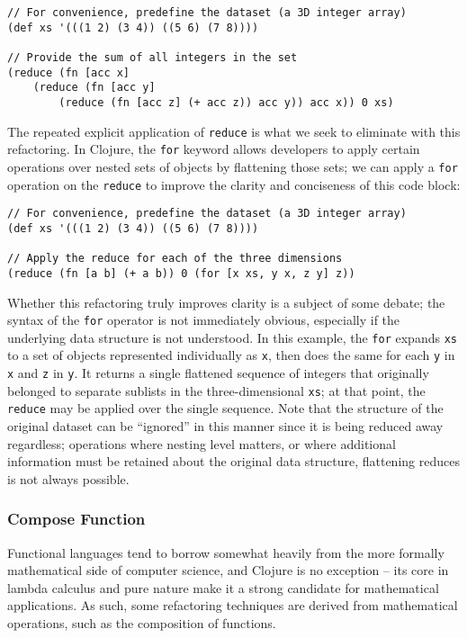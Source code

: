 \documentclass{article}
\begin{document}
\begin{verbatim}
// For convenience, predefine the dataset (a 3D integer array)
(def xs '(((1 2) (3 4)) ((5 6) (7 8))))

// Provide the sum of all integers in the set
(reduce (fn [acc x]
    (reduce (fn [acc y]
        (reduce (fn [acc z] (+ acc z)) acc y)) acc x)) 0 xs)
\end{verbatim}

The repeated explicit application of \verb!reduce! is what we seek to eliminate with this refactoring. In Clojure, the \verb!for! keyword allows developers to apply certain operations over nested sets of objects by flattening those sets; we can apply a \verb!for! operation on the \verb!reduce! to improve the clarity and conciseness of this code block:

\begin{verbatim}
// For convenience, predefine the dataset (a 3D integer array)
(def xs '(((1 2) (3 4)) ((5 6) (7 8))))

// Apply the reduce for each of the three dimensions
(reduce (fn [a b] (+ a b)) 0 (for [x xs, y x, z y] z))
\end{verbatim}

Whether this refactoring truly improves clarity is a subject of some debate; the syntax of the \verb!for! operator is not immediately obvious, especially if the underlying data structure is not understood. In this example, the \verb!for! expands \verb!xs! to a set of objects represented individually as \verb!x!, then does the same for each \verb!y! in \verb!x! and \verb!z! in \verb!y!. It returns a single flattened sequence of integers that originally belonged to separate sublists in the three-dimensional \verb!xs!; at that point, the \verb!reduce! may be applied over the single sequence. Note that the structure of the original dataset can be ``ignored'' in this manner since it is being reduced away regardless; operations where nesting level matters, or where additional information must be retained about the original data structure, flattening reduces is not always possible.

\subsubsection{Compose Function}

Functional languages tend to borrow somewhat heavily from the more formally mathematical side of computer science, and Clojure is no exception -- its core in lambda calculus and pure nature make it a strong candidate for mathematical applications. As such, some refactoring techniques are derived from mathematical operations, such as the composition of functions.
\end{document}
